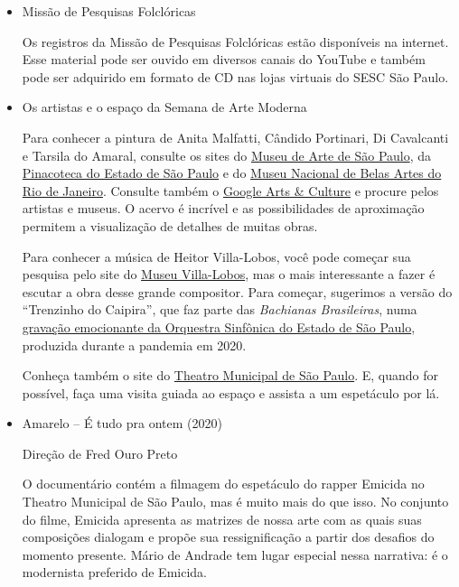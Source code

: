 \documentclass[11pt]{extarticle}
\begin{document}
\begin{itemize}
\item Missão de Pesquisas Folclóricas

Os registros da Missão de Pesquisas Folclóricas estão disponíveis na
internet. Esse material pode ser ouvido em diversos canais do YouTube e
também pode ser adquirido em formato de CD nas lojas virtuais do SESC
São Paulo.

\item Os artistas e o espaço da Semana de Arte Moderna


Para conhecer a pintura de Anita Malfatti, Cândido Portinari, Di
Cavalcanti e Tarsila do Amaral, consulte os sites do \href{https://masp.org.br/}{Museu de Arte de
São Paulo}, da \href{http://pinacoteca.org.br/}{Pinacoteca do Estado de São
Paulo} e do \href{https://mnba.gov.br/}{Museu Nacional de Belas Artes do Rio de Janeiro}. 
Consulte também o \href{https://artsandculture.google.com/}{Google Arts \& Culture} e
procure pelos artistas e museus. O acervo é incrível e as possibilidades
de aproximação permitem a visualização de detalhes de muitas obras.

Para conhecer a música de Heitor Villa-Lobos, você pode começar sua
pesquisa pelo site do \href{https://museuvillalobos.museus.gov.br/}{Museu Villa-Lobos}, 
mas o mais interessante a fazer é escutar a obra desse grande compositor. Para começar,
sugerimos a versão do ``Trenzinho do Caipira'', que faz parte das
\emph{Bachianas Brasileiras}, numa \href{https://youtu.be/KTKVgaY56NI}{gravação emocionante da Orquestra
Sinfônica do Estado de São Paulo}, produzida durante a pandemia em 2020.

Conheça também o site do \href{https://theatromunicipal.org.br/}
{Theatro Municipal de São Paulo}. E, quando for possível, faça uma visita 
guiada ao espaço e assista a um espetáculo por lá.

\item Amarelo -- É tudo pra ontem (2020)

Direção de Fred Ouro Preto

O documentário contém a filmagem do espetáculo do rapper Emicida no
Theatro Municipal de São Paulo, mas é muito mais do que isso. No
conjunto do filme, Emicida apresenta as matrizes de nossa arte com as
quais suas composições dialogam e propõe sua ressignificação a partir
dos desafios do momento presente. Mário de Andrade tem lugar especial
nessa narrativa: é o modernista preferido de Emicida.
\end{itemize}
\end{document}
